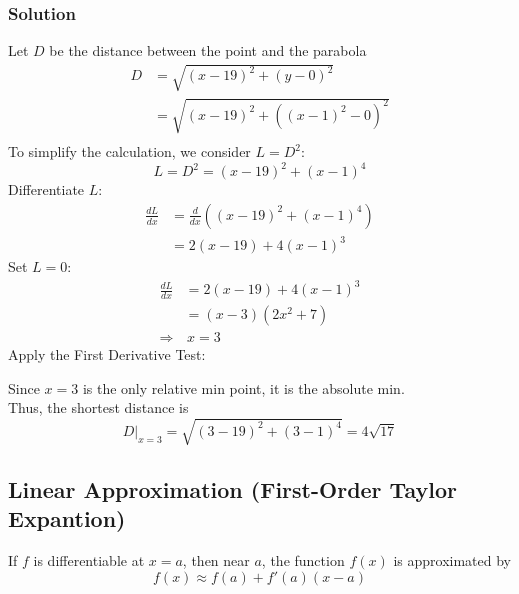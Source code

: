 \documentclass[11pt]{article}
\begin{document}
\subsubsection*{Solution}
Let $D$ be the distance between the point and the parabola 
\[
    \begin{split}
        D&=\sqrt{(x-19)^2+(y-0)^2}\\[.5em]
        &=\sqrt{(x-19)^2+((x-1)^2-0)^2}\\[.5em]
    \end{split}    
\]
To simplify the calculation, we consider $L=D^2$: 
\[
    L=D^2=(x-19)^2+(x-1)^4
\]
Differentiate $L$:
\[
    \begin{split}
        \frac{dL}{dx}&=\frac{d}{dx}\left((x-19)^2+(x-1)^4\right)\\[.5em]
        &=2(x-19)+4(x-1)^3
    \end{split}
\]
Set $L=0$:
\[
    \begin{split}
        \frac{dL}{dx}&=2(x-19)+4(x-1)^3\\[.5em]
        &=(x-3)(2x^2+7)\\[.5em]
        \Rightarrow &\,x=3
    \end{split}
\]
Apply the First Derivative Test:
\begin{center}
\end{center}
Since $x=3$ is the only relative min point, it is the absolute min.\\ 
Thus, the shortest distance is
\[
    \left.D\right|_{x=3}=\sqrt{(3-19)^2+(3-1)^4}=4\sqrt{17}
\]
\subsection{Linear Approximation (First-Order Taylor Expantion)}
If $f$ is differentiable at $x=a$, then near $a$, the function $f(x)$ is approximated by
\[
    f(x) \approx f(a)+f'(a)(x-a)
\]
\end{document}
